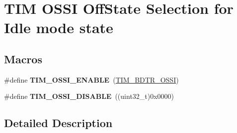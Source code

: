 \hypertarget{group___t_i_m___o_s_s_i___off___state___selection__for___idle__mode__state}{}\section{T\+IM O\+S\+SI Off\+State Selection for Idle mode state}
\label{group___t_i_m___o_s_s_i___off___state___selection__for___idle__mode__state}
\subsection*{Macros}
\begin{DoxyCompactItemize}
\item 
\#define {\bfseries T\+I\+M\+\_\+\+O\+S\+S\+I\+\_\+\+E\+N\+A\+B\+LE}~(\hyperlink{group___peripheral___registers___bits___definition_gab1cf04e70ccf3d4aba5afcf2496a411a}{T\+I\+M\+\_\+\+B\+D\+T\+R\+\_\+\+O\+S\+SI})\hypertarget{group___t_i_m___o_s_s_i___off___state___selection__for___idle__mode__state_gae5b5901b177cd054cd5503630892680f}{}\label{group___t_i_m___o_s_s_i___off___state___selection__for___idle__mode__state_gae5b5901b177cd054cd5503630892680f}

\item 
\#define {\bfseries T\+I\+M\+\_\+\+O\+S\+S\+I\+\_\+\+D\+I\+S\+A\+B\+LE}~((uint32\+\_\+t)0x0000)\hypertarget{group___t_i_m___o_s_s_i___off___state___selection__for___idle__mode__state_gab1a20c65a3d24ef770f8a2a14c24130b}{}\label{group___t_i_m___o_s_s_i___off___state___selection__for___idle__mode__state_gab1a20c65a3d24ef770f8a2a14c24130b}

\end{DoxyCompactItemize}


\subsection{Detailed Description}
